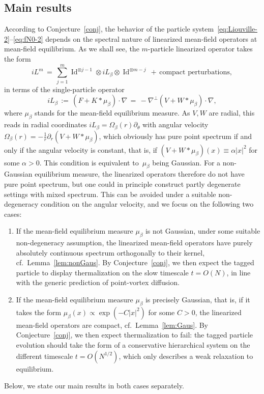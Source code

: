 \documentclass[a4paper,11pt,reqno,noindent]{amsart}
\theoremstyle{plain}
\numberwithin{equation}{section}
\newcommand{\Id}{\operatorname{Id}}
\newcommand{\3}{|\!|\!|}
\begin{document}
\subsection{Main results}
{According to Conjecture~\ref{conj}, the behavior of the particle system~\eqref{eq:Liouville-2}--\eqref{eq:fN0-2} depends on the spectral nature of linearized mean-field operators at mean-field equilibrium.
As we shall see, the $m$-particle linearized operator takes the form
\[iL^m\,=\,\sum_{j=1}^m\Id^{\otimes j-1}\otimes iL_\beta\otimes\Id^{\otimes m-j}\,+\,\text{compact perturbations},\]
in terms of the single-particle operator
\[iL_\beta\,:=\,(F+K\ast\mu_\beta)\cdot\nabla\,=\,-\nabla^\bot(V+W\ast\mu_\beta)\cdot\nabla,\]
where $\mu_\beta$ stands for the mean-field equilibrium measure. As $V,W$ are radial, this reads in radial coordinates $iL_\beta=\Omega_\beta(r)\partial_\theta$ with angular velocity $\Omega_\beta(r)=-\frac1r\partial_r(V+W\ast\mu_\beta)$, which obviously has pure point spectrum if and only if the angular velocity is constant, that is, if $(V+W\ast\mu_\beta)(x)\equiv\alpha |x|^2$ for some $\alpha>0$. This condition is equivalent to~$\mu_\beta$ being Gaussian. 
For a non-Gaussian equilibrium measure, the linearized operators therefore do not have pure point spectrum, but one could in principle construct partly degenerate settings with mixed spectrum. This can be avoided under a suitable non-degeneracy condition on the angular velocity, and we focus on the following two cases:}
\begin{enumerate}[---]
\item If the mean-field equilibrium measure $\mu_\beta$ is not Gaussian, under some suitable non-degeneracy assumption, the linearized mean-field operators have purely absolutely continuous spectrum orthogonally to their kernel, cf.~Lemma~\ref{lem:nonGaus}. {By Conjecture~\ref{conj},} we then expect the tagged particle to display thermalization on the slow timescale $t=O(N)$, in line with the generic prediction of point-vortex diffusion.
\smallskip\item If the mean-field equilibrium measure $\mu_\beta$ is precisely Gaussian, that is, if it takes the form $\mu_\beta(x)\propto\exp(-C|x|^2)$ for some $C>0$,
the linearized mean-field operators are compact, cf.~Lemma~\ref{lem:Gaus}. {By Conjecture~\ref{conj}, we then expect thermalization to fail: the tagged particle evolution should take the form of a conservative hierarchical system on the different timescale $t=O(N^{1/2})$, which only describes a weak relaxation to equilibrium.}
\end{enumerate}
Below, we state our main results in both cases separately.
\end{document}
